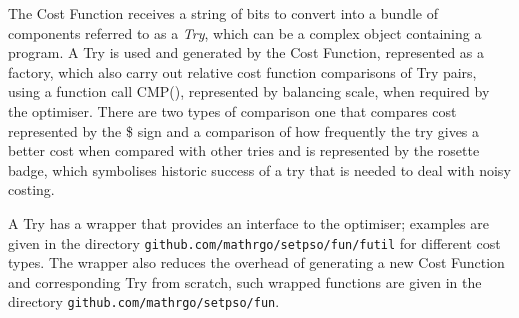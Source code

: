 \documentclass[a4paper,oneside,english]{book}
\numberwithin{equation}{section}
\numberwithin{figure}{section}
\newcommand{\codesorc}[1]{\texttt{github.com/mathrgo/setpso/#1}}
\begin{document}
	The Cost Function receives a string of bits to convert into a  bundle of components referred to as a \emph{Try}, which can be a complex object containing a program. A Try is used and generated by the Cost Function, represented as a factory, which also carry out relative cost function comparisons of Try pairs, using a function call CMP(), represented by balancing scale, when required  by the optimiser. There are two types of comparison one that compares cost represented by the \$ sign and a comparison of how frequently the try gives a better cost when compared with other tries and is represented by the rosette badge, which symbolises historic success of a try that is needed to deal with noisy costing. 
	
	A Try has a wrapper that provides an interface to the optimiser; examples are given in the directory \codesorc{fun/futil}   for different cost types. The wrapper also reduces the overhead of generating a new Cost Function  and corresponding Try from scratch, such wrapped functions are given in the directory \codesorc{fun}.
	
\end{document}

